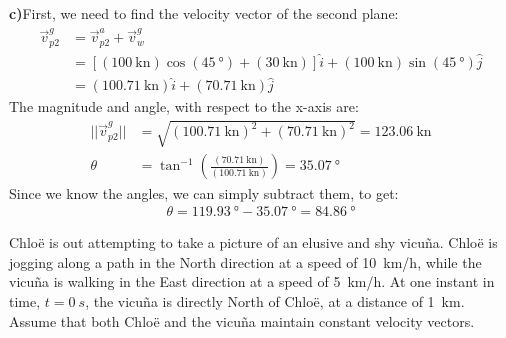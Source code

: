 \begin{solution}
\textbf{c)}First, we need to find the velocity vector of the second plane:
\begin{align*}
\vec v_{p2}^g &= \vec v_{p2}^a + \vec v_w^g\\
&=[(\SI{100}{\knot})\cos(\SI{45}{\degree})+(\SI{30}{\knot}) ]\hat i + (\SI{100}{\knot})\sin(\SI{45}{\degree})\hat j\\
&= (\SI{100.71}{\knot})\hat i + (\SI{70.71}{\knot})\hat j
\end{align*}
The magnitude and angle, with respect to the x-axis are:
\begin{align*}
|| \vec v_{p2}^g ||&= \sqrt{(\SI{100.71}{\knot})^2+(\SI{70.71}{\knot})^2} = \SI{123.06}{\knot}\\
\theta &= \tan^{-1}\left(\frac{(\SI{70.71}{\knot})}{(\SI{100.71}{\knot})}\right) = \SI{35.07}{\degree}
\end{align*}
Since we know the angles, we can simply subtract them, to get:
\begin{align*}
\theta = \SI{119.93}{\degree} - \SI{35.07}{\degree} = \SI{84.86}{\degree}
\end{align*}
\end{solution}


\question Chlo\"e is out attempting to take a picture of an elusive and shy vicu\~na. Chlo\"e is jogging along a path in the North direction at a speed of \SI{10}{km/h}, while the vicu\~na is walking in the East direction at a speed of \SI{5}{km/h}. At one instant in time, $t=\SI{0}{s}$, the vicu\~na is directly North of Chlo\"e, at a distance of \SI{1}{km}. Assume that both Chlo\"e and the vicu\~na maintain constant velocity vectors.

